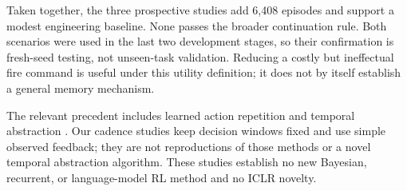 Taken together, the three prospective studies add 6,408 episodes and support a modest engineering baseline. None passes the broader continuation rule. Both scenarios were used in the last two development stages, so their confirmation is fresh-seed testing, not unseen-task validation. Reducing a costly but ineffectual fire command is useful under this utility definition; it does not by itself establish a general memory mechanism.

The relevant precedent includes learned action repetition and temporal abstraction \citep{lakshminarayanan2017dynamic,sharma2017figar}. Our cadence studies keep decision windows fixed and use simple observed feedback; they are not reproductions of those methods or a novel temporal abstraction algorithm. These studies establish no new Bayesian, recurrent, or language-model RL method and no ICLR novelty.
